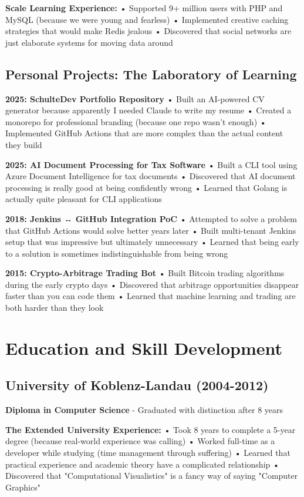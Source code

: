 \documentclass[10pt,a4paper]{article}
\begin{document}
\textbf{Scale Learning Experience:}
• Supported 9+ million users with PHP and MySQL (because we were young and fearless)
• Implemented creative caching strategies that would make Redis jealous
• Discovered that social networks are just elaborate systems for moving data around

\subsection{Personal Projects: The Laboratory of Learning}

\textbf{2025: SchulteDev Portfolio Repository}
• Built an AI-powered CV generator because apparently I needed Claude to write my resume
• Created a monorepo for professional branding (because one repo wasn't enough)
• Implemented GitHub Actions that are more complex than the actual content they build

\textbf{2025: AI Document Processing for Tax Software}
• Built a CLI tool using Azure Document Intelligence for tax documents
• Discovered that AI document processing is really good at being confidently wrong
• Learned that Golang is actually quite pleasant for CLI applications

\textbf{2018: Jenkins ↔ GitHub Integration PoC}
• Attempted to solve a problem that GitHub Actions would solve better years later
• Built multi-tenant Jenkins setup that was impressive but ultimately unnecessary
• Learned that being early to a solution is sometimes indistinguishable from being wrong

\textbf{2015: Crypto-Arbitrage Trading Bot}
• Built Bitcoin trading algorithms during the early crypto days
• Discovered that arbitrage opportunities disappear faster than you can code them
• Learned that machine learning and trading are both harder than they look

\section{Education and Skill Development}

\subsection{University of Koblenz-Landau (2004-2012)}
\textbf{Diploma in Computer Science} - Graduated with distinction after 8 years

\textbf{The Extended University Experience:}
• Took 8 years to complete a 5-year degree (because real-world experience was calling)
• Worked full-time as a developer while studying (time management through suffering)
• Learned that practical experience and academic theory have a complicated relationship
• Discovered that "Computational Visualistics" is a fancy way of saying "Computer Graphics"
\end{document}
